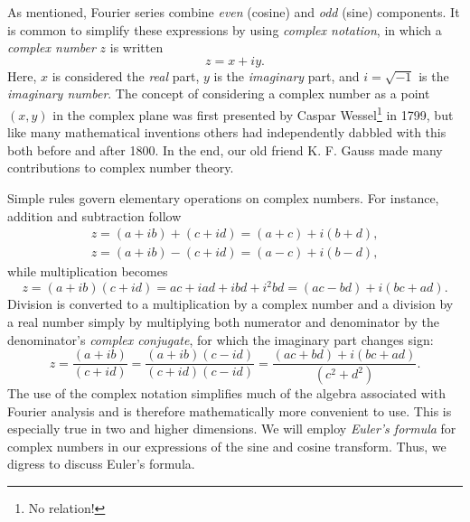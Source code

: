 As mentioned, Fourier series combine \emph{even} (cosine) and \emph{odd} (sine) components.
It is common to simplify these expressions by using \emph{complex notation},
in which a \emph{complex number} $z$ is written
\begin{equation}
	z = x + iy.
\end{equation}
Here, $x$ is considered the \emph{real} part, $y$ is the \emph{imaginary} part,
and $i = \sqrt{-1}$ is the \emph{imaginary number}.  The concept of considering a complex number as a
point $(x, y)$ in the complex plane was first presented by Caspar Wessel\footnote{No relation!} in 1799, but like many mathematical inventions
others had independently dabbled with this both before and after 1800.  In the end, our old friend K. F. Gauss made
many contributions to complex number theory.

Simple rules govern elementary
operations on complex numbers.  For instance, addition and subtraction follow
\begin{equation}
	\begin{array}{c}
	z = (a + ib) + (c + id) = (a + c) + i(b + d),\\
	z = (a + ib) - (c + id) = (a - c) + i(b - d),
	\end{array}
\end{equation}
while multiplication becomes
\begin{equation}
	z = (a + ib)(c + id) = ac + iad + ibd + i^2bd = (ac - bd) + i(bc + ad).
\end{equation}
Division is converted to a multiplication by a complex number and a division by a real number
simply by multiplying both numerator and denominator by the denominator's \emph{complex conjugate}, for
which the imaginary part changes sign:
\begin{equation}
	z = \frac{(a + ib)}{(c + id)} = \frac{(a + ib)(c - id)}{(c + id)(c - id)} = \frac{(ac + bd) + i(bc + ad)}{(c^2 + d^2)}.
\end{equation}
The use of the complex notation simplifies much of the algebra associated with Fourier
analysis and is therefore mathematically more convenient to use.  This is especially true
in two and higher dimensions. We will employ
\emph{Euler's formula} for complex numbers in our expressions of the sine and cosine transform.
Thus, we digress to discuss Euler's formula.


